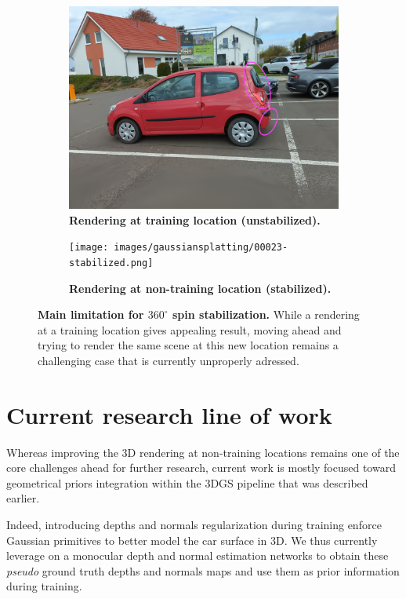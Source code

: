 \begin{figure}[htb!]
  \centering
  \begin{subfigure}[b]{0.45\linewidth}
    \includegraphics[width=\linewidth]{images/gaussiansplatting/00023-unstabilized.png}
    \caption{\textbf{Rendering at training location (unstabilized).}}
  \end{subfigure}
  \quad %
  \begin{subfigure}[b]{0.45\linewidth}
    \texttt{[image: images/gaussiansplatting/00023-stabilized.png]}
    \caption{\textbf{Rendering at non-training location (stabilized).}}
  \end{subfigure}
  \caption{\textbf{Main limitation for $360^{\circ}$ spin stabilization.} While a rendering at a training location gives appealing result, moving ahead and trying to render the same scene at this new location remains a challenging case that is currently unproperly adressed.}
  \label{fig:nontraining-rendering}
\end{figure}

\section{Current research line of work}

Whereas improving the 3D rendering at non-training locations remains one of the core challenges ahead for further research, current work is mostly focused toward geometrical priors integration within the 3D\ac{GS} pipeline that was described earlier. 

Indeed, introducing depths and normals regularization during training enforce Gaussian primitives to better model the car surface in 3D. 
We thus currently leverage on a monocular depth \citep{ke2023repurposing,yang2024depth} and normal \citep{bae2024rethinking,ye2024stablenormal} estimation networks to obtain these \textit{pseudo} ground truth depths and normals maps and use them as prior information during training. 

